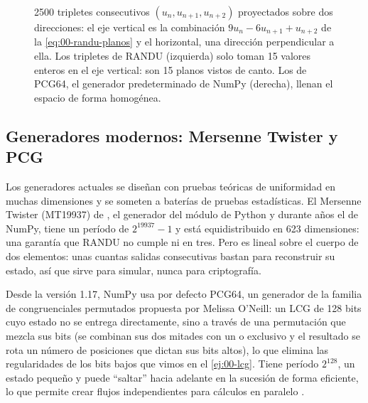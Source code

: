 \begin{figure}[t]
\centering
{}
\caption[RANDU cae en planos]{\num{2500} tripletes consecutivos $(u_n,u_{n+1},u_{n+2})$ proyectados sobre dos direcciones: el eje vertical es la combinación $9u_n-6u_{n+1}+u_{n+2}$ de la \cref{eq:00-randu-planos} y el horizontal, una dirección perpendicular a ella. Los tripletes de RANDU (izquierda) solo toman 15 valores enteros en el eje vertical: son 15 planos vistos de canto. Los de PCG64, el generador predeterminado de NumPy (derecha), llenan el espacio de forma homogénea.}
\label{fig:00-randu}
\end{figure}

\subsection{Generadores modernos: Mersenne Twister y PCG}

Los generadores actuales se diseñan con pruebas teóricas de uniformidad en muchas dimensiones y se someten a baterías de pruebas estadísticas. El Mersenne Twister (MT19937) de \textcite{c00-matsumoto1998}, el generador del módulo  de Python y durante años el de NumPy, tiene un período de $2^{19937}-1$ y está equidistribuido en 623 dimensiones: una garantía que RANDU no cumple ni en tres. Pero es lineal sobre el cuerpo de dos elementos: unas cuantas salidas consecutivas bastan para reconstruir su estado, así que sirve para simular, nunca para criptografía.

Desde la versión 1.17, NumPy usa por defecto PCG64, un generador de la familia de congruenciales permutados propuesta por Melissa O'Neill: un LCG de 128 bits cuyo estado no se entrega directamente, sino a través de una permutación que mezcla sus bits (se combinan sus dos mitades con un o exclusivo y el resultado se rota un número de posiciones que dictan sus bits altos), lo que elimina las regularidades de los bits bajos que vimos en el \cref{ej:00-lcg}. Tiene período $2^{128}$, un estado pequeño y puede ``saltar'' hacia adelante en la sucesión de forma eficiente, lo que permite crear flujos independientes para cálculos en paralelo \parencite{c00-numpypcg}.


